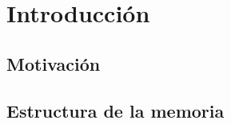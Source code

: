 \chapter{Introducción}\label{cap:introduccion}

\section{Motivación}

\section{Estructura de la memoria}
